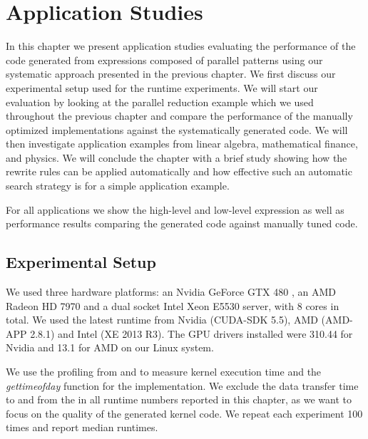 
\chapter{Application Studies}
\label{ch:sixth} %
\label{chapter:codeGeneration-evaluation}

In this chapter we present application studies evaluating the performance of the \OpenCL code generated from expressions composed of parallel patterns using our systematic approach presented in the previous chapter.
We first discuss our experimental setup used for the runtime experiments.
We will start our evaluation by looking at the parallel reduction example which we used throughout the previous chapter and compare the performance of the manually optimized \OpenCL implementations against the systematically generated code.
We will then investigate application examples from linear algebra, mathematical finance, and physics.
We will conclude the chapter with a brief study showing how the rewrite rules can be applied automatically and how effective such an automatic search strategy is for a simple application example.

For all applications we show the high-level and low-level expression as well as performance results comparing the generated \OpenCL code against manually tuned \OpenCL code.

\section{Experimental Setup}
We used three hardware platforms: an Nvidia GeForce GTX 480 \GPU, an AMD Radeon HD 7970 \GPU and a dual socket Intel Xeon E5530 server, with 8 cores in total.
We used the latest \OpenCL runtime from Nvidia (CUDA-SDK 5.5), AMD (AMD-APP 2.8.1) and Intel (XE 2013 R3).
The GPU drivers installed were 310.44 for Nvidia and 13.1 for AMD on our Linux system.

We use the profiling \APIs from \OpenCL and \CUDA to measure kernel execution time and the \textit{gettimeofday} function for the \CPU implementation.
We exclude the data transfer time to and from the \GPU in all runtime numbers reported in this chapter, as we want to focus on the quality of the generated \OpenCL kernel code.
We repeat each experiment 100 times and report median runtimes.



